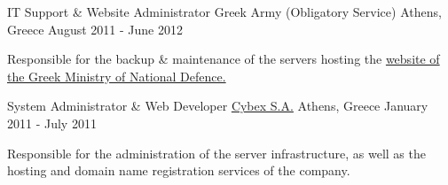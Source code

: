\begin{cventries}
\vspace{0.1in}

  \cventry
{IT Support \& Website Administrator} %
		{Greek Army (Obligatory Service)} %
    {Athens, Greece} %
    {August 2011 - June 2012} %
		{
      \begin{cvitems} %
      \item {Responsible for the backup \& maintenance of the servers hosting
          the \href{http://www.mod.mil.gr/mod/en/}{website of the Greek Ministry of National Defence.}}
      \end{cvitems}
        }


\vspace{0.1in}

  \cventry
        {System Administrator \& Web Developer}
        {\href{http://www.cybex.gr/}{Cybex S.A.}}
    {Athens, Greece}
    {January 2011 - July 2011}
		{
      \begin{cvitems}
      \item {Responsible for the administration of the server infrastructure,
          as well as the hosting and domain name registration services of the
          company.}
      \end{cvitems}
        }

\end{cventries}
\pagebreak
